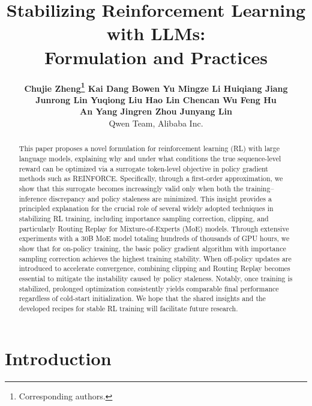 \documentclass{article}
\title{Stabilizing Reinforcement Learning with LLMs: \\ Formulation and Practices}
\author{
\textbf{Chujie Zheng\thanks{Corresponding authors.} \squad Kai Dang \squad Bowen Yu\samethanks{} \squad Mingze Li \squad Huiqiang Jiang \\ Junrong Lin \squad Yuqiong Liu \squad Hao Lin \squad Chencan Wu \squad Feng Hu \\ An Yang \squad Jingren Zhou \squad Junyang Lin} \\
\vspace{1.5mm}
Qwen Team, Alibaba Inc.
}
\begin{document}
\maketitle

\begin{abstract}

This paper proposes a novel formulation for reinforcement learning (RL) with large language models, explaining why and under what conditions the true sequence-level reward can be optimized via a surrogate token-level objective in policy gradient methods such as REINFORCE.
Specifically, through a first-order approximation, we show that this surrogate becomes increasingly valid only when both the training–inference discrepancy and policy staleness are minimized.
This insight provides a principled explanation for the crucial role of several widely adopted techniques in stabilizing RL training, including importance sampling correction, clipping, and particularly Routing Replay for Mixture-of-Experts (MoE) models.
Through extensive experiments with a 30B MoE model totaling hundreds of thousands of GPU hours, we show that for on-policy training, the basic policy gradient algorithm with importance sampling correction achieves the highest training stability.
When off-policy updates are introduced to accelerate convergence, combining clipping and Routing Replay becomes essential to mitigate the instability caused by policy staleness.
Notably, once training is stabilized, prolonged optimization consistently yields comparable final performance regardless of cold-start initialization.
We hope that the shared insights and the developed recipes for stable RL training will facilitate future research.

\end{abstract}

\section{Introduction}
\label{sec:intro}
\end{document}
